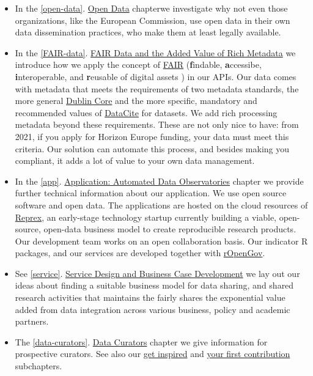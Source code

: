 \documentclass[
  a4paper,
  openany, a4paper, oneside]{book}
\begin{document}
\begin{itemize}
\item
  In the \ref{open-data}. \protect\hyperlink{open-data}{Open Data} chapterwe investigate why not even those organizations, like the European Commission, use open data in their own data dissemination practices, who make them at least legally available.
\item
  In the \ref{FAIR-data}. \protect\hyperlink{FAIR-data}{FAIR Data and the Added Value of Rich Metadata} we introduce how we apply the concept of \protect\hyperlink{FAIR}{FAIR} (\textbf{f}indable, \textbf{a}ccessibe, \textbf{i}nteroperable, and \textbf{r}eusable of digital assets ) in our APIs. Our data comes with metadata that meets the requirements of two metadata standards, the more general \protect\hyperlink{Dublin-Core}{Dublin Core} and the more specific, mandatory and recommended values of \protect\hyperlink{DataCite}{DataCite} for datasets. We add rich processing metadata beyond these requirements. These are not only nice to have: from 2021, if you apply for Horizon Europe funding, your data must meet this criteria. Our solution can automate this process, and besides making you compliant, it adds a lot of value to your own data management.
\item
  In the \ref{app}. \protect\hyperlink{app}{Application: Automated Data Observatories} chapter we provide further technical information about our application. We use open source software and open data. The applications are hosted on the cloud resources of \protect\hyperlink{reprex}{Reprex}, an early-stage technology startup currently building a viable, open-source, open-data business model to create reproducible research products. Our development team works on an open collaboration basis. Our indicator R packages, and our services are developed together with \href{https://music.dataobservatory.eu/author/ropengov/}{rOpenGov}.
\item
  See \ref{service}. \protect\hyperlink{service}{Service Design and Business Case Development} we lay out our ideas about finding a suitable business model for data sharing, and shared research activities that maintains the fairly shares the exponential value added from data integration across various business, policy and academic partners.
\item
  The \ref{data-curators}. \protect\hyperlink{data-curators}{Data Curators} chapter we give information for prospective curators. See also our \protect\hyperlink{get-inspired}{get inspired} and \protect\hyperlink{first-contribution}{your first contribution} subchapters.
\end{itemize}
\end{document}

